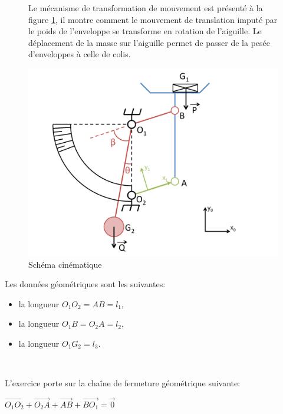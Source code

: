 \begin{figure}[htbp]
\begin{minipage}[c]{.4\linewidth}
Le mécanisme de transformation de mouvement est présenté à la figure \ref{fig:image5}, il montre comment le mouvement de translation imputé par le poids de l'enveloppe se transforme en rotation de l'aiguille. Le déplacement de la masse sur l'aiguille permet de passer de la pesée d'enveloppes à celle de colis.
\end{minipage}
\hfill
\begin{minipage}[c]{.55\linewidth}
\begin{center}
\includegraphics[width=1\linewidth]{img/pl_cin.pdf}
\caption{Schéma cinématique}
\label{fig:image5}
\end{center}
\end{minipage}
\end{figure}

Les données géométriques sont les suivantes:
\begin{itemize}
 \item la longueur $O_1O_2=AB=l_{1}$,
 \item la longueur $O_1B=O_2A=l_{2}$,
 \item la longueur $O_1G_2=l_{3}$.
\end{itemize}

~\

L'exercice porte sur la chaîne de fermeture géométrique suivante:

$\overrightarrow{O_1O_2}+\overrightarrow{O_2A}+\overrightarrow{AB}+\overrightarrow{BO_1}=\overrightarrow{0}$

